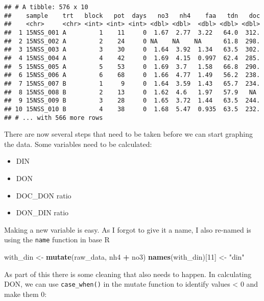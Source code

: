 \documentclass[]{article}
\newenvironment{Shaded}{\begin{snugshade}}{\end{snugshade}}
\newcommand{\KeywordTok}[1]{\textcolor[rgb]{0.13,0.29,0.53}{\textbf{#1}}}
\newcommand{\DataTypeTok}[1]{\textcolor[rgb]{0.13,0.29,0.53}{#1}}
\newcommand{\DecValTok}[1]{\textcolor[rgb]{0.00,0.00,0.81}{#1}}
\newcommand{\StringTok}[1]{\textcolor[rgb]{0.31,0.60,0.02}{#1}}
\newcommand{\OtherTok}[1]{\textcolor[rgb]{0.56,0.35,0.01}{#1}}
\newcommand{\OperatorTok}[1]{\textcolor[rgb]{0.81,0.36,0.00}{\textbf{#1}}}
\newcommand{\NormalTok}[1]{#1}
\providecommand{\tightlist}{%
  \setlength{\itemsep}{0pt}\setlength{\parskip}{0pt}}
\begin{document}
\begin{verbatim}
## # A tibble: 576 x 10
##    sample    trt   block   pot  days   no3   nh4    faa   tdn   doc
##    <chr>     <chr> <int> <int> <int> <dbl> <dbl>  <dbl> <dbl> <dbl>
##  1 15NSS_001 A         1    11     0  1.67  2.77  3.22   64.0  312.
##  2 15NSS_002 A         2    24     0 NA    NA    NA      61.8  298.
##  3 15NSS_003 A         3    30     0  1.64  3.92  1.34   63.5  302.
##  4 15NSS_004 A         4    42     0  1.69  4.15  0.997  62.4  285.
##  5 15NSS_005 A         5    53     0  1.69  3.7   1.58   66.8  290.
##  6 15NSS_006 A         6    68     0  1.66  4.77  1.49   56.2  238.
##  7 15NSS_007 B         1     9     0  1.64  3.59  1.43   65.7  234.
##  8 15NSS_008 B         2    13     0  1.62  4.6   1.97   57.9   NA 
##  9 15NSS_009 B         3    28     0  1.65  3.72  1.44   63.5  244.
## 10 15NSS_010 B         4    38     0  1.68  5.47  0.935  63.5  232.
## # ... with 566 more rows
\end{verbatim}

There are now several steps that need to be taken before we can start
graphing the data. Some variables need to be calculated:

\begin{itemize}
\tightlist
\item
  DIN
\item
  DON
\item
  DOC\_DON ratio
\item
  DON\_DIN ratio
\end{itemize}

Making a new variable is easy. As I forgot to give it a name, I also
re-named is using the \texttt{name} function in base R

\begin{Shaded}
\begin{Highlighting}[]
\NormalTok{with_din <-}\StringTok{ }\KeywordTok{mutate}\NormalTok{(raw_data, nh4 }\OperatorTok{+}\StringTok{ }\NormalTok{no3)}
\KeywordTok{names}\NormalTok{(with_din)[}\DecValTok{11}\NormalTok{] <-}\StringTok{ "din"}
\end{Highlighting}
\end{Shaded}

As part of this there is some cleaning that also needs to happen. In
calculating DON, we can use \texttt{case\_when()} in the mutate function
to identify values \textless{} 0 and make them 0:

\begin{Shaded}
\end{Shaded}
\end{document}
